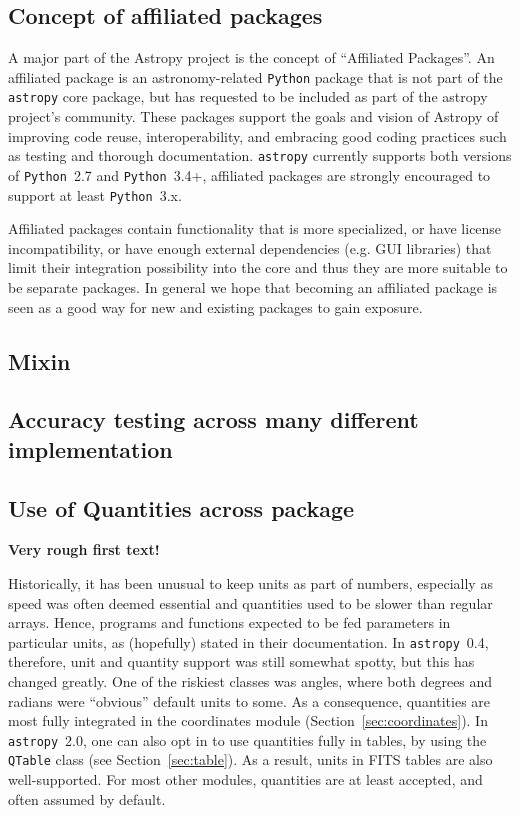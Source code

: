 \documentclass[modern]{aastex61}
\newcommand{\package}[1]{\texttt{#1}\xspace}
\newcommand{\python}{\package{Python}\xspace}
\newcommand{\astropy}{Astropy\xspace}
\newcommand{\astropypkg}{\package{astropy}\xspace}
\newcommand{\sectionname}{Section\xspace}
\begin{document}
\subsection{Concept of affiliated packages}
%
\par A major part of the \astropy project is the concept of “Affiliated
Packages”. An affiliated package is an astronomy-related \python package that
is not part of the \astropypkg core package, but has requested to be
included as part of the astropy project’s community. These packages support
the goals and vision of \astropy of improving code reuse,
interoperability, and embracing good coding practices such as testing and
thorough documentation. \astropypkg currently supports both versions of
\python~2.7 and \python~3.4+, affiliated packages are strongly encouraged to
support at least \python~3.x.
%
\par Affiliated packages contain functionality that is more specialized, or
have license incompatibility, or have enough external dependencies (e.g. GUI
libraries) that limit their integration possibility into the core and thus
they are more suitable to be separate packages. In general we hope that
becoming an affiliated package is seen as a good way for new and existing
packages to gain exposure.
%
%
\subsection{Mixin}

\subsection{Accuracy testing across many different implementation}

\subsection{Use of Quantities across package}

{\bf Very rough first text!}

Historically, it has been unusual to keep units as part of numbers, especially as speed was often deemed essential and quantities used to be slower than regular arrays. Hence, programs and functions expected to be fed parameters in particular units, as (hopefully) stated in their documentation.  In \astropypkg~0.4, therefore, unit and quantity support was still somewhat spotty, but this has changed greatly.  One of the riskiest classes was angles, where both degrees and radians were ``obvious'' default units to some. As a consequence, quantities are most fully integrated in the coordinates module (\sectionname~\ref{sec:coordinates}). In \astropypkg~2.0, one can also opt in to use quantities fully in tables, by using the {\tt QTable} class (see \sectionname~\ref{sec:table}). As a result, units in FITS tables are also well-supported. For most other modules, quantities are at least accepted, and often assumed by default.
\end{document}

